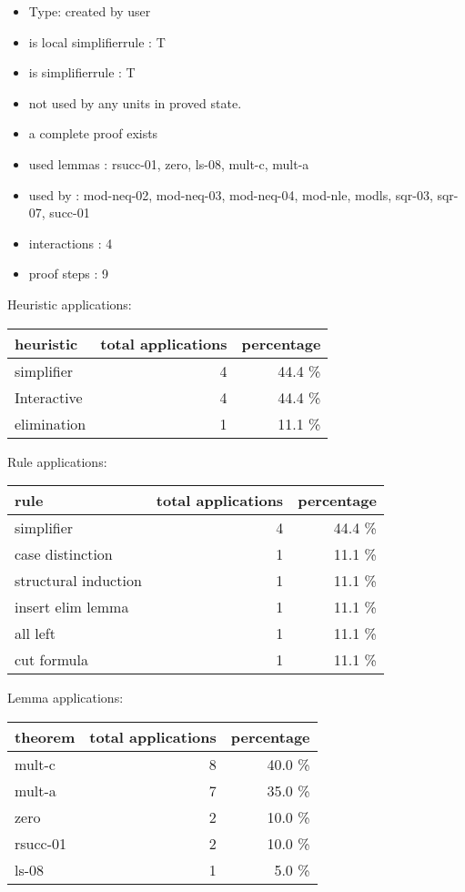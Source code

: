 \documentclass[a4paper]{article}
\begin{document}
\begin{itemize}

\item Type: created by user

\item is local simplifierrule : T
\item is simplifierrule : T
\item not used by any units in proved state.
\item       a complete proof exists
\item       used lemmas  : rsucc-01, zero, ls-08, mult-c, mult-a
\item       used by      : mod-neq-02, mod-neq-03, mod-neq-04, mod-nle, modls, sqr-03, sqr-07, succ-01
\item       interactions : 4
\item       proof steps  : 9
\end{itemize}

\medskip


Heuristic applications:

\begin{supertabular}{l|r|r}
heuristic	& total applications & percentage \\ \hline
simplifier & 4 & 44.4 \% \\
Interactive & 4 & 44.4 \% \\
elimination & 1 & 11.1 \% \\

\end{supertabular}

Rule applications:

\begin{supertabular}{l|r|r}
rule	        & total applications & percentage \\ \hline
simplifier & 4 & 44.4 \% \\
case distinction & 1 & 11.1 \% \\
structural induction & 1 & 11.1 \% \\
insert elim lemma & 1 & 11.1 \% \\
all left & 1 & 11.1 \% \\
cut formula & 1 & 11.1 \% \\

\end{supertabular}

Lemma applications:

\begin{supertabular}{l|r|r}
theorem	        & total applications & percentage \\ \hline
mult-c & 8 & 40.0 \% \\
mult-a & 7 & 35.0 \% \\
zero & 2 & 10.0 \% \\
rsucc-01 & 2 & 10.0 \% \\
ls-08 & 1 & 5.0 \% \\

\end{supertabular}
\end{document}
